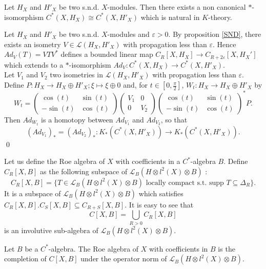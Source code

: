 \begin{prop}
Let $H_X$ and $H'_X$ be two s.n.d. $X$-modules. Then there exists a non canonical $*$-isomorphism $C^*(X,H_X)\cong C^*(X,H'_X)$ which is natural in $K$-theory.
\end{prop}
\begin{dem}
Let $H_X$ and $H'_X$ be two s.n.d. $X$-modules and $\varepsilon>0$. By proposition \ref{SND}, there exists an isometry $V\in\mathcal L(H_X,H'_X)$ with propagation less than $\varepsilon$. Hence $Ad_V(T) = V T V^*$ defines a bounded linear map $C_R[X,H_X]\rightarrow C_{R+2\varepsilon}[X,H_X']$ which extends to a $*$-isomorphism $Ad_V : C^*(X,H_X)\rightarrow C^*(X,H'_X)$.\\

Let $V_1$ and $V_2$ two isometries in $\mathcal L(H_X,H'_X)$ with propagation less than $\varepsilon$. Define $P : H_X\rightarrow H_X\oplus H'_X ; \xi \mapsto \xi \oplus 0$ and, for $t\in [0,\frac{\pi}{2}]$, $W_t : H_X \rightarrow H_X\oplus H'_X$ by 
\[W_t = 
\begin{pmatrix} \cos(t) & \sin (t)\\ -\sin (t) & \cos (t)\end{pmatrix}
\begin{pmatrix} V_1 & 0 \\ 0 & V_2 \end{pmatrix}
\begin{pmatrix} \cos(t) & \sin (t)\\ -\sin (t) & \cos (t)\end{pmatrix}^* P.\] 
Then $Ad_{W_t}$ is a homotopy between $Ad_{V_1}$ and $Ad_{V_2}$, so that 
\[(Ad_{V_1})_* = (Ad_{V_2})_* : K_*(C^*(X,H'_X))\rightarrow K_*(C^*(X,H'_X)).\]
\qed
\end{dem}

Let us define the Roe algebra of $X$ with coefficients in a $C^*$-algebra $B$. Define $C_R[X,B]$ as the following subspace of $\mathcal L_B(H\otimes l^2(X)\otimes B)$ :
\[C_R[X,B] = \{T\in \mathcal L_B(H\otimes l^2(X)\otimes B) \text{ locally compact  s.t. supp }T\subseteq \Delta_R \}.\]
It is a subspace of $\mathcal L_B(H\otimes l^2(X)\otimes B)$ which satisfies $C_R[X,B].C_S[X,B]\subseteq C_{R+S}[X,B]$. It is easy to see that 
\[C[X,B] = \bigcup_{R>0} C_R[X,B]\] 
is an involutive sub-algebra of $\mathcal L_B(H\otimes l^2(X)\otimes B)$.

\begin{definition}
Let $B$ be a $C^*$-algebra. The Roe algebra of $X$ with coefficients in $B$ is the completion of $C[X,B]$ under the operator norm of $\mathcal L_B(H\otimes l^2(X)\otimes B)$. 
\end{definition} 

